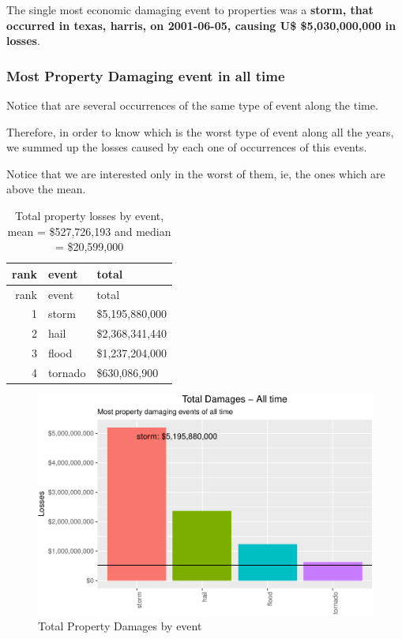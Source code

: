\documentclass[]{article}
\begin{document}
The single most economic damaging event to properties was a
\textbf{storm, that occurred in texas, harris, on 2001-06-05, causing
U\$ \$5,030,000,000 in losses}.

\subsubsection{Most Property Damaging event in all
time}\label{most-property-damaging-event-in-all-time}

Notice that are several occurrences of the same type of event along the
time.

Therefore, in order to know which is the worst type of event along all
the years, we summed up the losses caused by each one of occurrences of
this events.

Notice that we are interested only in the worst of them, ie, the ones
which are above the mean.

\begin{longtable}[]{@{}rll@{}}
\caption{Total property losses by event, mean = \$527,726,193 and median
= \$20,599,000}\tabularnewline
\toprule
rank & event & total\tabularnewline
\midrule
\endfirsthead
\toprule
rank & event & total\tabularnewline
\midrule
\endhead
1 & storm & \$5,195,880,000\tabularnewline
2 & hail & \$2,368,341,440\tabularnewline
3 & flood & \$1,237,204,000\tabularnewline
4 & tornado & \$630,086,900\tabularnewline
\bottomrule
\end{longtable}

\begin{figure}[htbp]
\centering
\includegraphics{readme_files/figure-latex/prop-all-plot-1.pdf}
\caption{Total Property Damages by event}
\end{figure}
\end{document}
